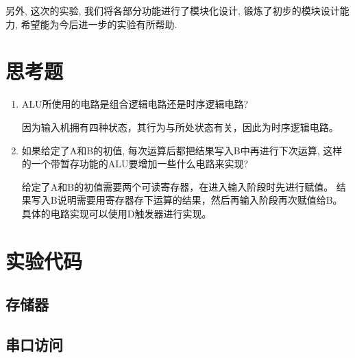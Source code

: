 另外, 这次的实验, 我们将各部分功能进行了模块化设计,
锻炼了初步的模块设计能力, 希望能为今后进一步的实验有所帮助.

\section{思考题}
\begin{enumerate}
  \item ALU所使用的电路是组合逻辑电路还是时序逻辑电路?

    因为输入机拥有四种状态，其行为与所处状态有关，因此为时序逻辑电路。

  \item 如果给定了A和B的初值, 每次运算后都把结果写入B中再进行下次运算,
    这样的一个带暂存功能的ALU要增加一些什么电路来实现?

    给定了A和B的初值需要两个可读寄存器，在进入输入阶段时先进行赋值。
    结果写入B说明需要用寄存器存下运算的结果，然后再输入阶段再次赋值给B。
    具体的电路实现可以使用D触发器进行实现。

\end{enumerate}

\section{实验代码}

\subsection{存储器}


\subsection{串口访问}

